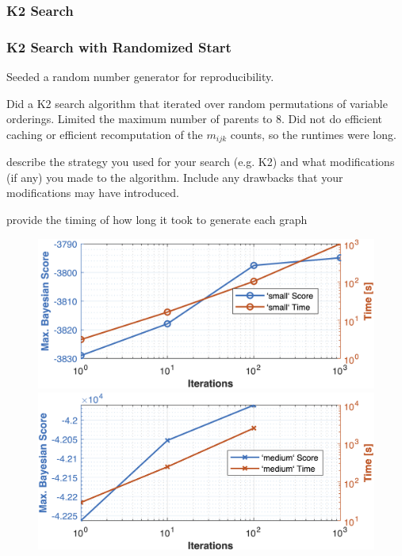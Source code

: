 \documentclass[10pt,letterpaper]{article}
\begin{document}
	\subsubsection*{\sf \textbf{K2 Search}}
	
	\subsubsection*{\sf \textbf{K2 Search with Randomized Start}}
	
	Seeded a random number generator for reproducibility.
	
	Did a K2 search algorithm that iterated over random permutations of variable orderings. Limited the maximum number of parents to 8. Did not do efficient caching or efficient recomputation of the $m_{ijk}$ counts, so the runtimes were long.
	
	describe the strategy you used for your search (e.g. K2) and what modifications (if any) you made to the algorithm. Include any drawbacks that your modifications may have introduced.
	
	provide the timing of how long it took to generate each graph 

	\begin{figure}[b!]
		\centering
		\includegraphics[width=0.4\linewidth]{figs/small-score-time.png}
		\hspace*{0.05\linewidth}
		\includegraphics[width=0.4\linewidth]{figs/medium-score-time.png}
		\setlength{\belowcaptionskip}{-10pt}
		\label{fig:time_score_graph}
	\end{figure}
\end{document}
